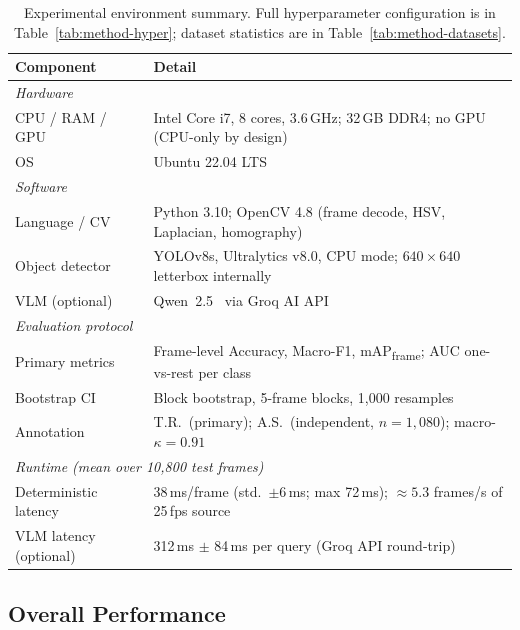 \documentclass[a4paper,fleqn]{cas-dc}
\begin{document}
\begin{table}[!ht]
\caption{Experimental environment summary. Full hyperparameter configuration is in Table~\ref{tab:method-hyper}; dataset statistics are in Table~\ref{tab:method-datasets}.}
\label{tab:expsetup}
\centering
\small
\setlength{\tabcolsep}{5pt}
\renewcommand{\arraystretch}{1.15}
\begin{tabularx}{\linewidth}{p{2.6cm} X}
\toprule
\textbf{Component} & \textbf{Detail} \\
\midrule
\multicolumn{2}{l}{\textit{Hardware}} \\[1pt]
CPU / RAM / GPU & Intel Core i7, 8 cores, 3.6\,GHz; 32\,GB DDR4; no GPU (CPU-only by design) \\
OS              & Ubuntu 22.04 LTS \\[3pt]
\multicolumn{2}{l}{\textit{Software}} \\[1pt]
Language / CV   & Python 3.10; OpenCV 4.8 (frame decode, HSV, Laplacian, homography) \\
Object detector & YOLOv8s, Ultralytics v8.0, CPU mode; $640{\times}640$ letterbox internally \\
VLM (optional)  & Qwen~2.5~\citep{qwen25vl2025} via Groq AI API~\citep{groqapi2025} \\[3pt]
\multicolumn{2}{l}{\textit{Evaluation protocol}} \\[1pt]
Primary metrics & Frame-level Accuracy, Macro-F1, mAP\textsubscript{frame}; AUC one-vs-rest per class \\
Bootstrap CI    & Block bootstrap, 5-frame blocks, 1{,}000 resamples \\
Annotation      & T.R.\ (primary); A.S.\ (independent, $n{=}1{,}080$); macro-$\kappa{=}0.91$ \\[3pt]
\multicolumn{2}{l}{\textit{Runtime (mean over 10{,}800 test frames)}} \\[1pt]
Deterministic latency & 38\,ms/frame (std.\ $\pm$6\,ms; max 72\,ms); ${\approx}5.3$ frames/s of 25\,fps source \\
VLM latency (optional) & 312\,ms $\pm$ 84\,ms per query (Groq API round-trip) \\
\bottomrule
\end{tabularx}
\end{table}
 
 
\FloatBarrier
\subsection{Overall Performance}
\label{sec:overall}
 
\end{document}
